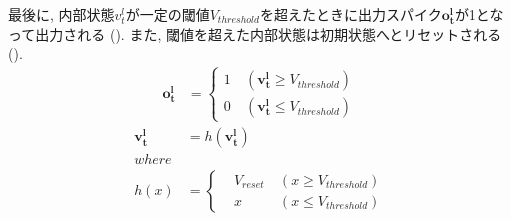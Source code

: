 最後に, 内部状態$v_t^l$が一定の閾値$V_{threshold}$を超えたときに出力スパイク$\bm{o_t^l}$が1となって出力される ().
また, 閾値を超えた内部状態は初期状態へとリセットされる ().
\begin{equation}
    \begin{split}
      \bm{o_t^{l}}&=\left\{
        \begin{alignedat}{2}
          1 &\:(\bm{v_t^l}{\geq}V_{threshold})\\
          0 &\:(\bm{v_t^l}{\leq}V_{threshold})
        \end{alignedat}
      \right. 
    \end{split} \label{eq:outputSpike}
  \end{equation}
  \begin{equation}
    \begin{split}
      \bm{v_t^l}&=h(\bm{v_t^l})\\
    where\\
    h(x)&=\left\{
      \begin{alignedat}{2}
        &V_{reset} &\:(x{\geq}V_{threshold})\\
        &x &\:(x{\leq}V_{threshold})
      \end{alignedat}
    \right. 
    \end{split} \label{eq:outputSpike2}
  \end{equation}
